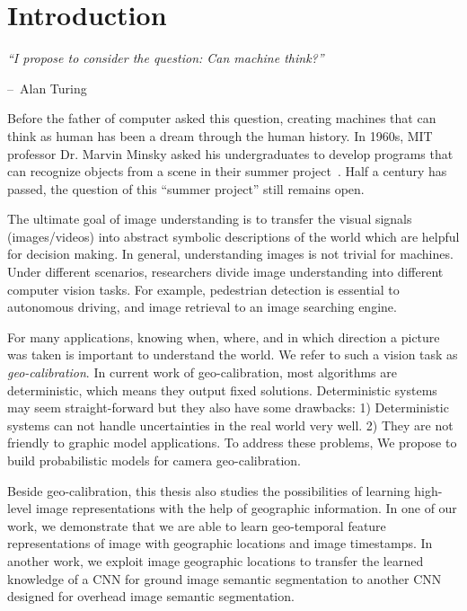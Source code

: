 \chapter{Introduction}
\label{chap:intro}

\makeatletter
\newenvironment{chapquote}[2][2em]
{\setlength{\@tempdima}{#1} \def\chapquote@author{#2} \parshape 1
  \@tempdima \dimexpr\textwidth-2\@tempdima\relax \itshape}
{\par\normalfont\hfill--\
\chapquote@author\hspace*{\@tempdima}\par\bigskip}
\makeatother

\begin{chapquote}{Alan Turing}
  ``I propose to consider the question: Can machine think?''
\end{chapquote}

Before the father of computer asked this question, creating
machines that can think as human has been a dream through the human
history. In 1960s, MIT professor Dr. Marvin Minsky asked his
undergraduates to develop programs that can recognize objects from a
scene in their summer project~\cite{boden2006mind}. Half a century has
passed, the question of this ``summer project'' still remains open.

The ultimate goal of image understanding is to transfer the visual
signals (images/videos) into abstract symbolic descriptions of the
world which are helpful for decision making.
In general, understanding images is not trivial for machines.
Under different scenarios, researchers divide image
understanding into different computer vision tasks. For example,
pedestrian detection is essential to autonomous driving, and image
retrieval to an image searching engine.

For many applications, knowing when, where, and in which direction a
picture was taken is important to understand the world. We refer to 
such a vision task as {\em geo-calibration}.
In current work of geo-calibration, most algorithms are
deterministic, which means they output fixed solutions. Deterministic
systems may seem straight-forward but they also have some 
drawbacks: 1) Deterministic systems can not handle uncertainties in
the real world very well. 2) They are not
friendly to graphic model applications.
To address these problems, We propose to build probabilistic models
for camera geo-calibration.

Beside geo-calibration, this thesis also studies the possibilities of
learning high-level image representations with the help of geographic
information. In one of our work, we demonstrate that we are able to
learn geo-temporal feature representations of image with geographic
locations and image timestamps. In another work, we exploit image geographic
locations to transfer the learned knowledge of a CNN for ground image
semantic segmentation to another CNN designed for overhead image
semantic segmentation.

